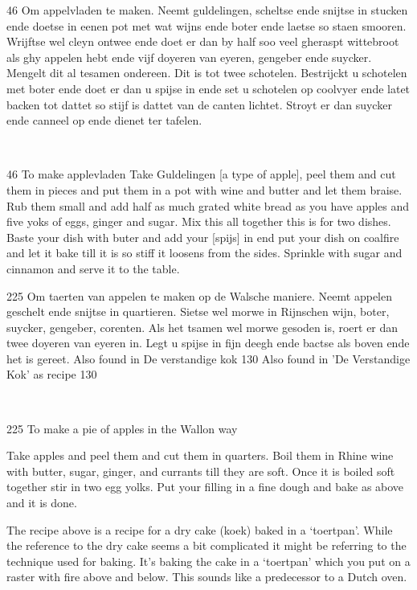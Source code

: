 \documentclass[a4paper]{article}
\begin{document}
\medskip
\begin{minipage}{.45\textwidth}
46 Om appelvladen te maken.
Neemt guldelingen, scheltse ende snijtse in stucken ende doetse in eenen pot met wat wijns ende boter ende laetse so staen smooren. Wrijftse wel cleyn ontwee ende doet er dan by half soo veel gheraspt wittebroot als ghy appelen hebt ende vijf doyeren van eyeren, gengeber ende suycker. Mengelt dit al tesamen ondereen. Dit is tot twee schotelen. Bestrijckt u schotelen met boter ende doet er dan u spijse in ende set u schotelen op coolvyer ende latet backen tot dattet so stijf is dattet van de canten lichtet. Stroyt er dan suycker ende canneel op ende dienet ter tafelen.	\cite{cb}
\end{minipage}
\begin{minipage}{0.05\textwidth}
\ \ \ 
\end{minipage}
\begin{minipage}{.45\textwidth}
46 To make applevladen
Take Guldelingen [a type of apple], peel them and cut them in pieces and put them in a pot with wine and butter and let them braise. Rub them small and add half as much grated white bread as you have apples and five yoks of eggs, ginger and sugar. Mix this all together this is for two dishes. Baste your dish with buter and add your [spijs] in end put your dish on coalfire and let it bake till it is so stiff it loosens from the sides. Sprinkle with sugar and cinnamon and serve it to the table. 
\end{minipage}

\medskip
\begin{minipage}{.45\textwidth}
225 Om taerten van appelen te maken op de Walsche maniere.
Neemt appelen geschelt ende snijtse in quartieren. Sietse wel morwe in Rijnschen wijn, boter, suycker, gengeber, corenten. Als het tsamen wel morwe gesoden is, roert er dan twee doyeren van eyeren in. Legt u spijse in fijn deegh ende bactse als boven ende het is gereet.	Also found in De verstandige kok 130 \cite{cb} Also found in 'De Verstandige Kok' as recipe 130 

\end{minipage}
\begin{minipage}{0.05\textwidth}
\ \ \ 
\end{minipage}
\begin{minipage}{.45\textwidth}
225 To make a pie of apples in the Wallon way

Take apples and peel them and cut them in quarters. Boil them in Rhine wine with butter, sugar, ginger, and currants till they are soft. Once it is boiled soft together stir in two egg yolks. Put your filling in a fine dough and bake as above and it is done.

The recipe above is a recipe for a dry cake (koek) baked in a ‘toertpan’. While the reference to the dry cake seems a bit complicated it might be referring to the technique used for baking. It’s baking the cake in a ‘toertpan’ which you put on a raster with fire above and below. This sounds like a predecessor to a Dutch oven.
\end{minipage}
\end{document}
